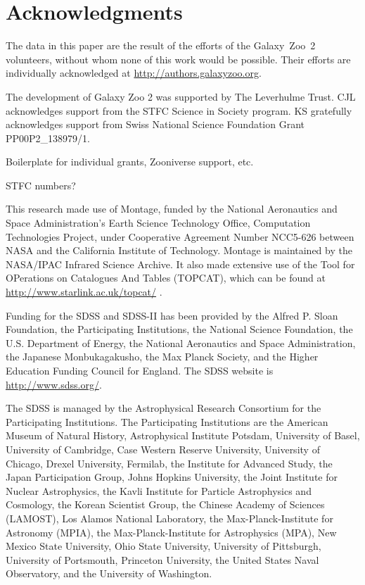 \documentclass[useAMS,usenatbib]{mn2e}
\begin{document}
\section*{Acknowledgments}
The data in this paper are the result of the efforts of the Galaxy~Zoo~2 volunteers, without whom none of this work would be possible. Their efforts are individually acknowledged at \url{http://authors.galaxyzoo.org}. 

The development of Galaxy Zoo 2 was supported by The Leverhulme Trust. CJL acknowledges support from the STFC Science in Society program. KS gratefully acknowledges support from Swiss National Science Foundation Grant PP00P2\_138979/1. 

Boilerplate for individual grants, Zooniverse support, etc.

STFC numbers?

This research made use of Montage, funded by the National Aeronautics and Space Administration's Earth Science Technology Office, Computation Technologies Project, under Cooperative Agreement Number NCC5-626 between NASA and the California Institute of Technology. Montage is maintained by the NASA/IPAC Infrared Science Archive. It also made extensive use of the Tool for OPerations on Catalogues And Tables (TOPCAT), which can be found at \url{http://www.starlink.ac.uk/topcat/} \citep{tay05,tay11}. 

Funding for the SDSS and SDSS-II has been provided by the Alfred P. Sloan Foundation, the Participating Institutions, the National Science Foundation, the U.S. Department of Energy, the National Aeronautics and Space Administration, the Japanese Monbukagakusho, the Max Planck Society, and the Higher Education Funding Council for England. The SDSS website is \url{http://www.sdss.org/}.

The SDSS is managed by the Astrophysical Research Consortium for the Participating Institutions. The Participating Institutions are the American Museum of Natural History, Astrophysical Institute Potsdam, University of Basel, University of Cambridge, Case Western Reserve University, University of Chicago, Drexel University, Fermilab, the Institute for Advanced Study, the Japan Participation Group, Johns Hopkins University, the Joint Institute for Nuclear Astrophysics, the Kavli Institute for Particle Astrophysics and Cosmology, the Korean Scientist Group, the Chinese Academy of Sciences (LAMOST), Los Alamos National Laboratory, the Max-Planck-Institute for Astronomy (MPIA), the Max-Planck-Institute for Astrophysics (MPA), New Mexico State University, Ohio State University, University of Pittsburgh, University of Portsmouth, Princeton University, the United States Naval Observatory, and the University of Washington.
\end{document}
